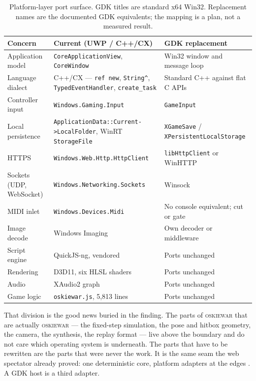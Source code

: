 \documentclass[10pt,letterpaper,twocolumn]{article}
\newcommand{\game}{\textsc{oskiewar}}
\newcommand{\code}[1]{\texttt{#1}}
\begin{document}
\begin{table}[!t]
\centering
\caption{Platform-layer port surface. GDK titles are standard x64 Win32. Replacement names are the documented GDK equivalents; the mapping is a plan, not a measured result.}
\label{tab:port}
\footnotesize
\begin{tabularx}{\textwidth}{@{}P{0.20\textwidth}P{0.26\textwidth}L@{}}
\toprule
Concern & Current (UWP / C++/CX) & GDK replacement \\
\midrule
Application model & \code{CoreApplicationView}, \code{CoreWindow} & Win32 window and message loop \\
Language dialect & C++/CX --- \code{ref new}, \code{String\^{}}, \code{TypedEventHandler}, \code{create\_task} & Standard C++ against flat C APIs \\
Controller input & \code{Windows.Gaming.Input} & \code{GameInput} \\
Local persistence & \code{ApplicationData::\allowbreak Current->\allowbreak LocalFolder}, WinRT \code{StorageFile} & \code{XGameSave} / \code{XPersistent\-Local\-Storage} \\
HTTPS & \code{Windows.Web.Http.HttpClient} & \code{libHttpClient} or WinHTTP \\
Sockets (UDP, WebSocket) & \code{Windows.Networking.Sockets} & Winsock \\
MIDI inlet & \code{Windows.Devices.Midi} & No console equivalent; cut or gate \\
Image decode & Windows Imaging & Own decoder or middleware \\
Script engine & QuickJS-ng, vendored & Ports unchanged \\
Rendering & D3D11, six HLSL shaders & Ports unchanged \\
Audio & XAudio2 graph & Ports unchanged \\
Game logic & \code{oskiewar.js}, 5,813 lines & Ports unchanged \\
\bottomrule
\end{tabularx}
\end{table}

That division is the good news buried in the finding. The parts of \game{} that are actually \game{} --- the fixed-step simulation, the pose and hitbox geometry, the camera, the synthesis, the replay format --- live above the boundary and do not care which operating system is underneath. The parts that have to be rewritten are the parts that were never the work. It is the same seam the web spectator already proved: one deterministic core, platform adapters at the edges \cite{scudder2026pieces,scudder2026os}. A GDK host is a third adapter.
\end{document}
